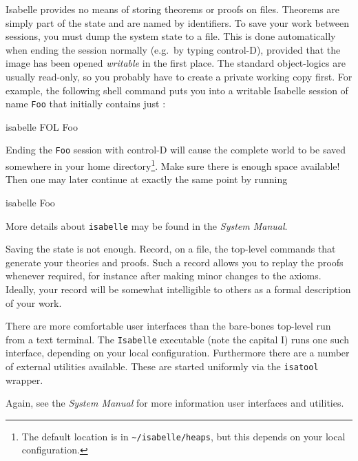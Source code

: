 Isabelle provides no means of storing
theorems or proofs on files.  Theorems are simply part of the \ML{}
state and are named by \ML{} identifiers.  To save your work between
sessions, you must dump the \ML{} system state to a file.  This is done
automatically when ending the session normally (e.g.\ by typing
control-D), provided that the image has been opened \emph{writable} in
the first place.  The standard object-logics are usually read-only, so
you probably have to create a private working copy first.  For example,
the following shell command puts you into a writable Isabelle session
of name \texttt{Foo} that initially contains just \FOL:
\begin{ttbox}
isabelle FOL Foo
\end{ttbox}
Ending the \texttt{Foo} session with control-D will cause the complete
\ML{} world to be saved somewhere in your home directory\footnote{The
  default location is in \texttt{\~\relax/isabelle/heaps}, but this
  depends on your local configuration.}.  Make sure there is enough
space available! Then one may later continue at exactly the same point
by running
\begin{ttbox}
isabelle Foo  
\end{ttbox}

More details about \texttt{isabelle} may be found in the \emph{System
  Manual}.

\medskip Saving the state is not enough.  Record, on a file, the
top-level commands that generate your theories and proofs.  Such a
record allows you to replay the proofs whenever required, for instance
after making minor changes to the axioms.  Ideally, your record will
be somewhat intelligible to others as a formal description of your
work.

\medskip There are more comfortable user interfaces than the
bare-bones \ML{} top-level run from a text terminal.  The
\texttt{Isabelle} executable (note the capital I) runs one such
interface, depending on your local configuration.  Furthermore there
are a number of external utilities available.  These are started
uniformly via the \texttt{isatool} wrapper.

Again, see the \emph{System Manual} for more information user
interfaces and utilities.


